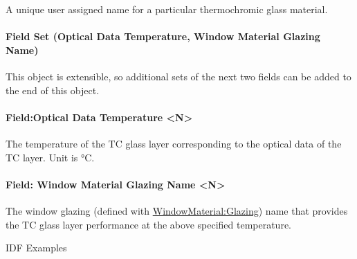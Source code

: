 A unique user assigned name for a particular thermochromic glass material.

\paragraph{Field Set (Optical Data Temperature, Window Material Glazing Name)}\label{field-set-optical-data-temperature-window-material-glazing-name-is-extensible.}

This object is extensible, so additional sets of the next two fields can be added to the end of this object.

\paragraph{Field:Optical Data Temperature \textless{}N\textgreater{}}\label{fieldoptical-data-temperature-n}

The temperature of the TC glass layer corresponding to the optical data of the TC layer. Unit is °C.

\paragraph{Field: Window Material Glazing Name \textless{}N\textgreater{}}\label{field-window-material-glazing-name-n}

The window glazing (defined with \hyperref[windowmaterialglazing]{WindowMaterial:Glazing}) name that provides the TC glass layer performance at the above specified temperature.

IDF Examples

